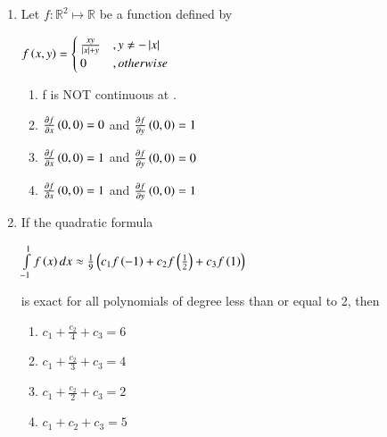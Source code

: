 \documentclass[journal]{IEEEtran}
\begin{document}
\begin{enumerate}[start=1]
\begin{enumerate}
\end{enumerate}
\item %
Let $f: \mathbb{R}^2 \mapsto \mathbb{R}$ be a function defined by 
\begin{center}
    $
    f\left(x,y\right) = 
    \begin{cases}
    \frac{xy}{\left\vert x\right\vert+y} &, y \neq - \left\vert x\right\vert \\
    0 &, otherwise
    \end{cases}
    $
\end{center}
\begin{enumerate} 
\item f is NOT continuous at .
\item  $\frac{\partial{f}}{\partial x}\left(0,0\right) = 0$ and $\frac{\partial{f}}{\partial y}\left(0,0\right) = 1$
\item  $\frac{\partial{f}}{\partial x}\left(0,0\right) = 1$ and $\frac{\partial{f}}{\partial y}\left(0,0\right) = 0$
\item  $\frac{\partial{f}}{\partial x}\left(0,0\right) = 1$ and $\frac{\partial{f}}{\partial y}\left(0,0\right) = 1$
\end{enumerate}
\item %
If the quadratic formula 
\begin{center}
    $\int\limits_{-1}^1 f\left(x\right)dx \approx\frac{1}{9}\left(c_1f\left(-1\right)+c_2f\left(\frac{1}{2}\right)+c_3f\left(1\right)\right)$
\end{center}
is exact for all polynomials of degree less than or equal to 2, then
\begin{enumerate} 
\item $c_1+\frac{c_2}{4}+c_3=6$
\item $c_1+\frac{c_2}{3}+c_3=4$ 
\item $c_1+\frac{c_2}{2}+c_3=2$
\item $c_1+c_2+c_3=5$
\end{enumerate}
\end{enumerate}
\end{document}
